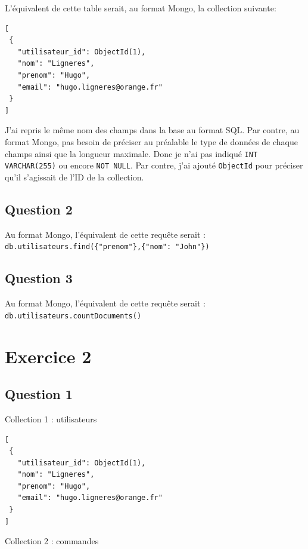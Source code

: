 \documentclass[12pt,a4paper]{article}
\begin{document}
L'équivalent de cette table serait, au format Mongo, la collection suivante:	
	
\begin{lstlisting}
[ 
 {
   "utilisateur_id": ObjectId(1),
   "nom": "Ligneres",
   "prenom": "Hugo",
   "email": "hugo.ligneres@orange.fr"
 }
]
\end{lstlisting}
	
	J'ai repris le même nom des champs dans la base au format SQL. Par contre, au format Mongo, pas besoin de préciser au préalable le type de données de chaque champs ainsi que la longueur maximale. Donc je n'ai pas indiqué \texttt{INT} \texttt{VARCHAR(255)} ou encore \texttt{NOT NULL}. Par contre, j'ai ajouté \texttt{ObjectId} pour préciser qu'il s'agissait de l'ID de la collection.
	
	\subsection*{Question 2}
	
	Au format Mongo, l'équivalent de cette requête serait : \\ \texttt{db.utilisateurs.find(\{"prenom"\},\{"nom": "John"\})}
	
	\subsection*{Question 3}
	
	Au format Mongo, l'équivalent de cette requête serait : \\
	
	\texttt{db.utilisateurs.countDocuments()}
	
\section*{Exercice 2}

	\subsection*{Question 1}

Collection 1 : utilisateurs \\

\begin{lstlisting}
[ 
 {
   "utilisateur_id": ObjectId(1),
   "nom": "Ligneres",
   "prenom": "Hugo",
   "email": "hugo.ligneres@orange.fr"
 }
]
\end{lstlisting}

Collection 2 : commandes \\
\end{document}
